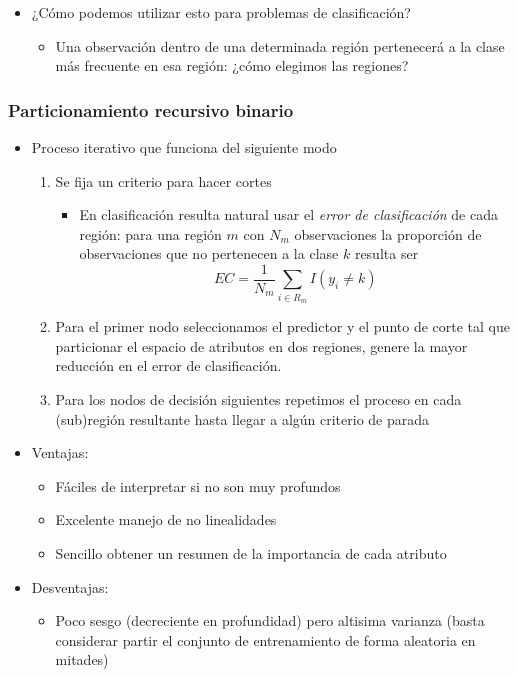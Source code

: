 \documentclass[leqno, 10pt, envcountsect]{beamer}
\numberwithin{equation}{section}
\theoremstyle{definition}
\theoremstyle{example}
\numberwithin{figure}{section}
\numberwithin{table}{section}
\let\olditem\item
\renewcommand{\item}{%
\olditem\vspace{1pt}}
\begin{document}
\begin{frame}
\begin{itemize}
\begin{itemize}
\begin{center}
          \end{center}
      \end{itemize}
    \item ¿Cómo podemos utilizar esto para problemas de clasificación?
      \begin{itemize}
        \item Una observación dentro de una determinada región pertenecerá a la
          clase más frecuente en esa región: ¿cómo elegimos las regiones?
      \end{itemize}
  \end{itemize}
\end{frame}
\begin{frame}
  \frametitle{Particionamiento recursivo binario}
  \begin{itemize}
    \item Proceso iterativo que funciona del siguiente modo
      \begin{enumerate}
        \item Se fija un criterio para hacer cortes
          \begin{itemize}
            \item En clasificación resulta natural
usar el \textit{error de clasificación} de cada región: para una región $m$ con $N_{m}$ observaciones la proporción de observaciones
que no pertenecen a la clase $k$ resulta ser
\begin{equation*}
  EC = \frac{1}{N_{m}}\sum_{i\in R_{m}}I(y_{i} \not = k)
\end{equation*}
          \end{itemize}
      \item Para el primer nodo seleccionamos el predictor y el punto de corte
        tal que particionar el espacio de atributos en dos regiones, genere la
          mayor reducción en el error de clasificación.
      \item Para los nodos de decisión
siguientes repetimos el proceso en cada (sub)región resultante hasta llegar a algún criterio de parada
      \end{enumerate}
  \item Ventajas:
    \begin{itemize}
      \item Fáciles de interpretar si no son muy profundos
      \item Excelente manejo de no linealidades
      \item Sencillo obtener un resumen de la importancia de cada atributo
    \end{itemize}
  \item Desventajas:
    \begin{itemize}
      \item  Poco sesgo (decreciente en profundidad) pero altisima varianza (basta considerar partir el
        conjunto de entrenamiento de forma aleatoria en mitades)
    \end{itemize}
  \end{itemize}
\end{frame}
\end{document}
